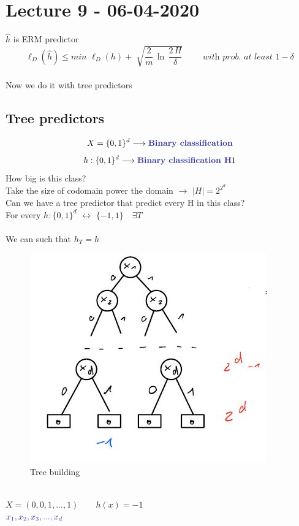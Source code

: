 \documentclass[../main.tex]{subfiles}
\begin{document}
\chapter{Lecture 9 - 06-04-2020}

$\hat{h}$  is ERM predictor
\\
$$
\ell_D\left(\hat{h}\right) \leq min \, \, \ell_D\left( h \right) + \sqrt[]{\frac{2}{m} \, \ln \, \frac{2 \, H}{\delta}} \qquad \textit{ with prob. at least $1-\delta$}
$$
\\
Now we do it with tree predictors\\
\section{Tree predictors}
$$
X  = \{ 0,1\}^d \longrightarrow \blue{Binary classification}
$$
$$
h : \{0, 1 \}^d \longrightarrow \blue{Binary classification H}1
$$
How big is this class? 
\\Take the size of codomain power the domain $\longrightarrow $ $|H| = 2^{2^d}$\\
Can we have a tree predictor that predict every H in this class?
\\
For every $ h : \{0,1\}^d$ $\longleftrightarrow$ $\{-1,1\} \quad \exists T$\\\\
We can  such that \quad $h_T = h$
\begin{figure}[h]
    \centering
    \includegraphics[width=0.6\linewidth]{../img/lez9-img1.JPG}
    \caption{Tree building}
\end{figure}\\
$ X = (0,0,1,...,1) \qquad h\left(x\right) = -1$ \\
$
\blue{$
x_1,x_2,x_3,...,x_d$}
$
\\\\
\end{document}

